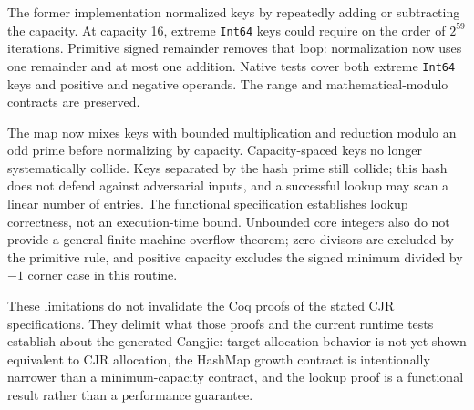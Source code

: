 \documentclass[11pt]{article}
\begin{document}
The former implementation normalized keys by repeatedly adding or subtracting
the capacity. At capacity 16, extreme \texttt{Int64} keys could require on
the order of $2^{59}$ iterations. Primitive signed remainder removes that
loop: normalization now uses one remainder and at most one addition.
Native tests cover both extreme \texttt{Int64} keys and positive and negative
operands. The range and mathematical-modulo contracts are preserved.

The map now mixes keys with bounded multiplication and reduction modulo
an odd prime before normalizing by capacity. Capacity-spaced keys no longer
systematically collide. Keys separated by the hash prime still collide;
this hash does not defend against adversarial inputs, and a successful
lookup may scan a linear number of entries. The functional specification
establishes lookup correctness, not an execution-time bound. Unbounded core
integers also do not provide a general finite-machine overflow theorem;
zero divisors are excluded by the primitive rule, and positive capacity
excludes the signed minimum divided by $-1$ corner case in this routine.

These limitations do not invalidate the Coq proofs of the stated CJR
specifications.  They delimit what those proofs and the current runtime
tests establish about the generated Cangjie: target allocation behavior is
not yet shown equivalent to CJR allocation, the HashMap growth contract is
intentionally narrower than a minimum-capacity contract, and the lookup
proof is a functional result rather than a performance guarantee.
\end{document}
